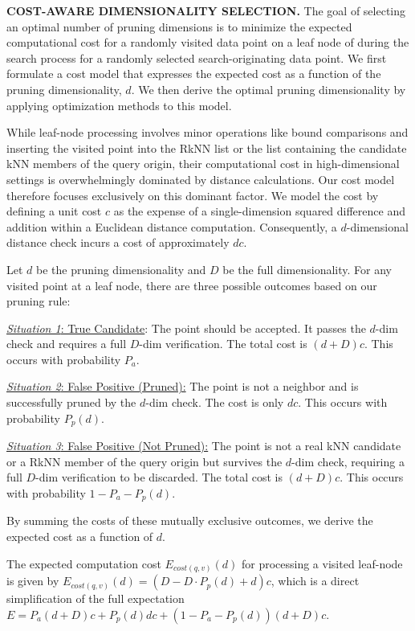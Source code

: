 \noindent \textbf{COST-AWARE DIMENSIONALITY SELECTION.} 
%
The goal of selecting an optimal number of pruning dimensions is to minimize the expected computational cost for a randomly visited data point on a leaf node of \dualtree during the search process for a randomly selected search-originating data point. We first formulate a cost model that expresses the expected cost as a function of the pruning dimensionality, $d$. We then derive the optimal pruning dimensionality by applying optimization methods to this model.

While leaf-node processing involves minor operations like bound comparisons and inserting the visited point into the RkNN list or the list containing the candidate kNN members of the query origin, their computational cost in high-dimensional settings is overwhelmingly dominated by distance calculations. Our cost model therefore focuses exclusively on this dominant factor. We model the cost by defining a unit cost $c$ as the expense of a single-dimension squared difference and addition within a Euclidean distance computation. Consequently, a $d$-dimensional distance check incurs a cost of approximately $dc$.

Let $d$ be the pruning dimensionality and $D$ be the full dimensionality. For any visited point at a leaf node, there are three possible outcomes based on our pruning rule:

\noindent \underline{\textit{Situation 1}: True Candidate}: The point should be accepted. It passes the $d$-dim check and requires a full $D$-dim verification. The total cost is $(d+D)c$. This occurs with probability $P_a$.

\noindent\underline {\textit{Situation 2}: False Positive (Pruned):} The point is not a neighbor and is successfully pruned by the $d$-dim check. The cost is only $dc$. This occurs with probability $P_p(d)$.

\noindent\underline {\textit{Situation 3}: False Positive (Not Pruned):} The point is not a real kNN candidate or a RkNN member of the query origin but survives the $d$-dim check, requiring a full $D$-dim verification to be discarded. The total cost is $(d+D)c$. This occurs with probability $1 - P_a - P_p(d)$.


By summing the costs of these mutually exclusive outcomes, we derive the expected cost as a function of $d$.

\begin{lemma}
\label{thm:cost-model}
The expected computation cost $E_{cost(q,v)}(d)$ for processing a visited leaf-node is given by $E_{cost(q,v)}(d)=(D-D\cdot P_p(d)+d)c$, which is a direct simplification of the full expectation $E = P_a(d+D)c + P_p(d)dc + (1-P_a-P_p(d))(d+D)c$.
\end{lemma}

